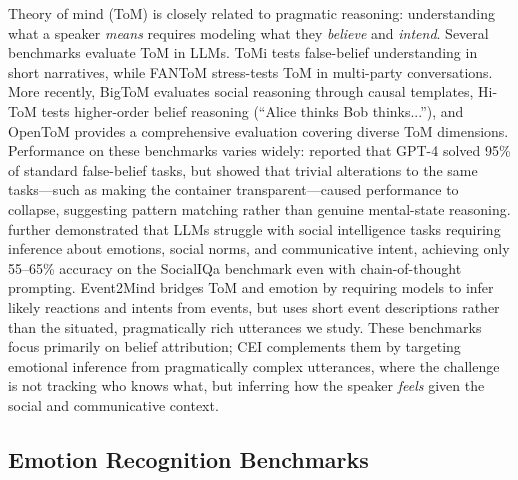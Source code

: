 \documentclass[twoside,11pt]{article}
\begin{document}
Theory of mind (ToM) is closely related to pragmatic reasoning: understanding what a speaker \textit{means} requires modeling what they \textit{believe} and \textit{intend}. Several benchmarks evaluate ToM in LLMs. ToMi \citep{le2019revisiting} tests false-belief understanding in short narratives, while FANToM \citep{kim2023fantom} stress-tests ToM in multi-party conversations. More recently, BigToM \citep{gandhi2023bigtom} evaluates social reasoning through causal templates, Hi-ToM \citep{wu2023hitom} tests higher-order belief reasoning (``Alice thinks Bob thinks...''), and OpenToM \citep{xu2024opentom} provides a comprehensive evaluation covering diverse ToM dimensions. Performance on these benchmarks varies widely: \citet{kosinski2024evaluating} reported that GPT-4 solved 95\% of standard false-belief tasks, but \citet{ullman2023large} showed that trivial alterations to the same tasks---such as making the container transparent---caused performance to collapse, suggesting pattern matching rather than genuine mental-state reasoning. \citet{sap2022neural} further demonstrated that LLMs struggle with social intelligence tasks requiring inference about emotions, social norms, and communicative intent, achieving only 55--65\% accuracy on the SocialIQa benchmark even with chain-of-thought prompting. Event2Mind \citep{rashkin2018event2mind} bridges ToM and emotion by requiring models to infer likely reactions and intents from events, but uses short event descriptions rather than the situated, pragmatically rich utterances we study. These benchmarks focus primarily on belief attribution; CEI complements them by targeting emotional inference from pragmatically complex utterances, where the challenge is not tracking who knows what, but inferring how the speaker \textit{feels} given the social and communicative context.

\subsection{Emotion Recognition Benchmarks}
\end{document}
